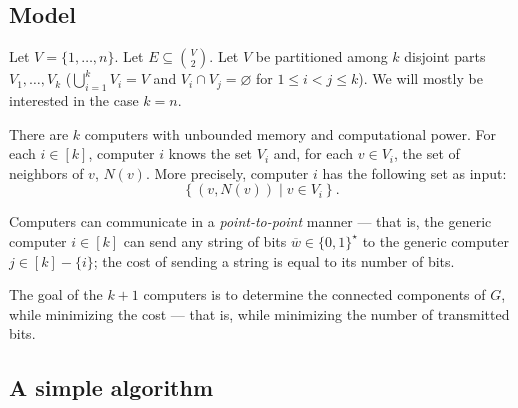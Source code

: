 \subsection{Model}

Let $V = \{1,\ldots, n\}$. Let $E \subseteq \binom V 2$. Let $V$ be partitioned among $k$ disjoint parts $V_1, \ldots, V_k$ ($\bigcup_{i=1}^k V_i = V$ and $V_i \cap V_j = \varnothing$ for $1 \le i <  j \le k$). We will mostly be interested in the case $k = n$.

\smallskip

There are $k$ computers with unbounded memory and computational power. For each $i \in [k]$, computer $i$ knows the set $V_i$ and, for each $v \in V_i$, the set of neighbors of $v$, $N(v)$. More precisely, computer $i$ has the following set as input: $$\left\{(v, N(v)) \mid v \in V_i\right\}.$$

Computers can communicate in a {\em point-to-point} manner --- that is, the generic computer $i \in [k]$ can send any string of bits $\overline{w} \in \{0,1\}^{\star}$ to the generic computer $j \in [k] - \{i\}$; the cost of sending a string is equal to its number of bits.

\smallskip

The goal of the $k+1$ computers is to determine the  connected components of $G$, while minimizing the cost --- that is, while minimizing the number of transmitted bits. 

\subsection{A simple algorithm}

